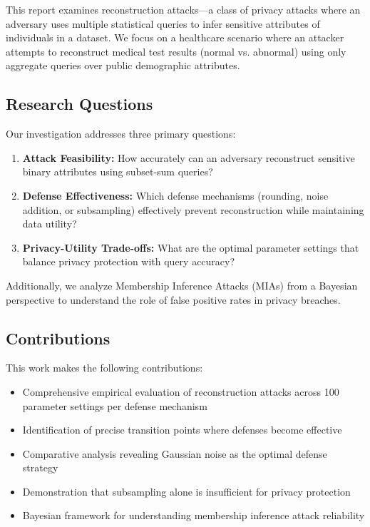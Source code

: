 \documentclass[11pt,letterpaper]{article}
\begin{document}
This report examines reconstruction attacks---a class of privacy attacks where an adversary uses multiple statistical queries to infer sensitive attributes of individuals in a dataset. We focus on a healthcare scenario where an attacker attempts to reconstruct medical test results (normal vs. abnormal) using only aggregate queries over public demographic attributes.

\subsection{Research Questions}

Our investigation addresses three primary questions:

\begin{enumerate}[leftmargin=*]
    \item \textbf{Attack Feasibility:} How accurately can an adversary reconstruct sensitive binary attributes using subset-sum queries?
    \item \textbf{Defense Effectiveness:} Which defense mechanisms (rounding, noise addition, or subsampling) effectively prevent reconstruction while maintaining data utility?
    \item \textbf{Privacy-Utility Trade-offs:} What are the optimal parameter settings that balance privacy protection with query accuracy?
\end{enumerate}

Additionally, we analyze Membership Inference Attacks (MIAs) from a Bayesian perspective to understand the role of false positive rates in privacy breaches.

\subsection{Contributions}

This work makes the following contributions:

\begin{itemize}[leftmargin=*]
    \item Comprehensive empirical evaluation of reconstruction attacks across 100 parameter settings per defense mechanism
    \item Identification of precise transition points where defenses become effective
    \item Comparative analysis revealing Gaussian noise as the optimal defense strategy
    \item Demonstration that subsampling alone is insufficient for privacy protection
    \item Bayesian framework for understanding membership inference attack reliability
\end{itemize}
\end{document}
